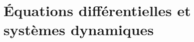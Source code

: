 \newcommand{\equadiff}{/home/robin/ENSEIGN/Cours/MathBiologie/L3-ENS-Math1/Exercices/EquaDiff}

\section{\'Equations différentielles et systèmes dynamiques} 









